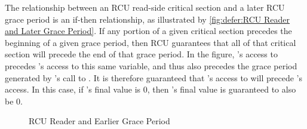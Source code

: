 The relationship between an RCU read-side critical section and a later
RCU grace period is an if-then relationship, as illustrated by
\cref{fig:defer:RCU Reader and Later Grace Period}.
If any portion of a given critical section precedes the beginning of
a given grace period, then RCU guarantees that all of that critical
section will precede the end of that grace period.
In the figure, 's access to  precedes 's access
to this same variable, and thus also precedes the grace period generated
by 's call to .
It is therefore guaranteed that 's access to  will precede
's access.
In this case, if 's final value is 0, then 's final value
is guaranteed to also be 0.

\QuickQuizEnd

\begin{figure}
\centering
{}
\caption{RCU Reader and Earlier Grace Period}
\label{fig:defer:RCU Reader and Earlier Grace Period}
\end{figure}

